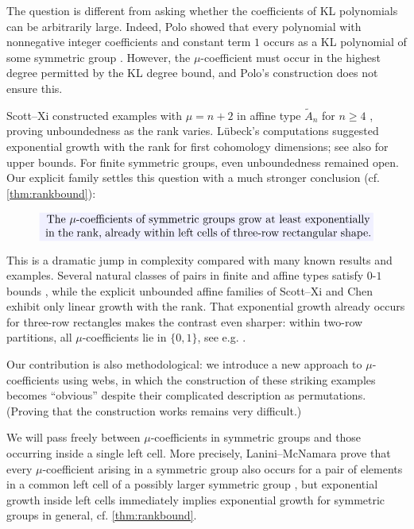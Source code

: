 \documentclass[a4paper,11pt]{amsart}
\let\emph\relax
\numberwithin{equation}{subsection}
\theoremstyle{plain}
\theoremstyle{definition}
\theoremstyle{remark}
\begin{document}
\begin{remark}
The question is different from asking whether the coefficients
of KL polynomials can be arbitrarily large. Indeed, Polo
showed that every polynomial with nonnegative integer
coefficients and constant term $1$ occurs as a KL polynomial
of some symmetric group \cite{Polo99}. However, the
$\mu$-coefficient must occur in the highest degree permitted
by the KL degree bound, and Polo's construction does not
ensure this.
\end{remark}

Scott--Xi constructed examples with $\mu=n+2$ in affine type
$\widetilde A_n$ for $n\ge4$ \cite{SX}, proving
unboundedness as the rank varies.
L\"ubeck's computations \cite{Luebeck} suggested exponential growth
with the rank for first cohomology dimensions; see also
\cite{ParkerStewart} for upper bounds.
For finite symmetric groups, even unboundedness remained open.
Our explicit family settles this question with a much stronger
conclusion (cf. \autoref{thm:rankbound}):

\[
\setlength{\fboxsep}{2pt}
\colorbox{blue!6}{
\begin{minipage}{0.85\textwidth}
\centering
\emph{The $\mu$-coefficients of symmetric groups grow at least
exponentially in the rank, already within left cells of
three-row rectangular shape.}
\end{minipage}}
\]

This is a dramatic jump in complexity compared with many known
results and examples.
Several natural classes of pairs in finite and affine types
satisfy $0$-$1$ bounds \cite{Green,Jones,Xi}, while the explicit
unbounded affine families of Scott--Xi and Chen \cite{SX,Chen}
exhibit only linear growth with the rank.
That exponential growth already occurs for three-row rectangles
makes the contrast even sharper: within two-row partitions, all
$\mu$-coefficients lie in $\{0,1\}$, see e.g.
\cite{LS}.

Our contribution is also methodological: we introduce a new
approach to $\mu$-coefficients using webs, in which the
construction of these striking examples becomes ``obvious''
despite their complicated description as permutations.
(Proving that the construction works remains very difficult.)

\begin{remark}
We will pass freely between
$\mu$-coefficients in symmetric groups and those occurring inside a
single left cell. More precisely, Lanini--McNamara prove that every $\mu$-coefficient
arising in a symmetric group also occurs for a pair of elements in a
common left cell of a possibly larger symmetric group
\cite[Corollary 4.3]{LM}, but
exponential growth inside left cells immediately implies exponential
growth for symmetric groups in general, cf. \autoref{thm:rankbound}.
\end{remark}
\end{document}

